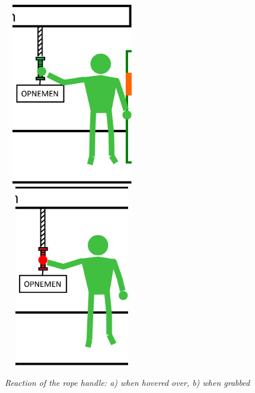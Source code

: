 \begin{figure}[H]
	\begin{center}
		\includegraphics[width=6cm, height=8cm]{figures/2_hover_over_rope.png}
		\includegraphics[width=6cm, height=8cm]{figures/3_grab_rope.png}
		\caption{\emph{Reaction of the rope handle: a) when hovered over, b) when grabbed}}
		\label{The regular view of the end desing of the UI}
	\end{center}
\end{figure}

